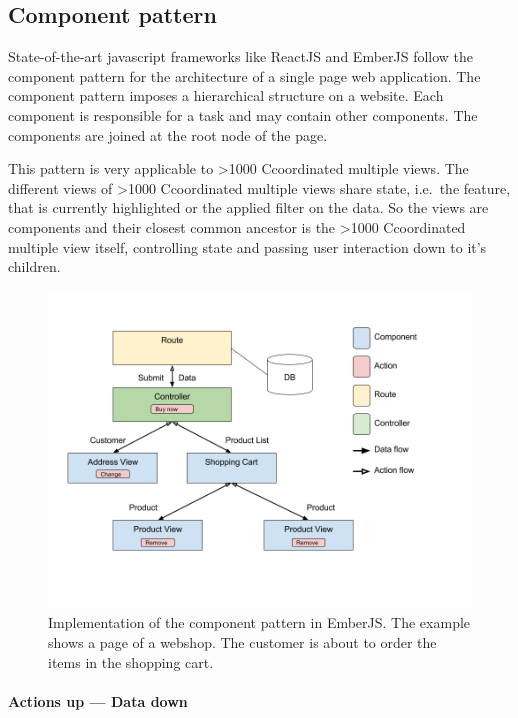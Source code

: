 \documentclass{article}
\newcommand\hmm[1]{\ifnum\ifhmode\spacefactor\else2000\fi>1000 \uppercase{#1}\else#1\fi}
\newcommand{\cmv}{\hmm{c}oordinated multiple view}
\newcommand{\cmvs}{\hmm{c}oordinated multiple views}
\begin{document}

\subsection{Component pattern}
State-of-the-art javascript frameworks like ReactJS and EmberJS follow the component pattern for the architecture of a single page web application.
The component pattern imposes a hierarchical structure on a website.
Each component is responsible for a task and may contain other components.
The components are joined at the root node of the page.

This pattern is very applicable to \cmvs{}.
The different views of \cmvs{} share state, i.e.\ the feature, that is currently highlighted or the applied filter on the data.
So the views are components and their closest common ancestor is the \cmv{} itself, controlling state and passing user interaction down to it's children.

\begin{figure}[h!]
  \centering
  \includegraphics[width=\textwidth]{images/data-down-actions-up.png}
  \caption{%
    Implementation of the component pattern in EmberJS\@.
    The example shows a page of a webshop.
    The customer is about to order the items in the shopping cart.
  }\label{fig:implementation:data-down-actions-up}
\end{figure}

\paragraph{Actions up --- Data down}
\end{document}
